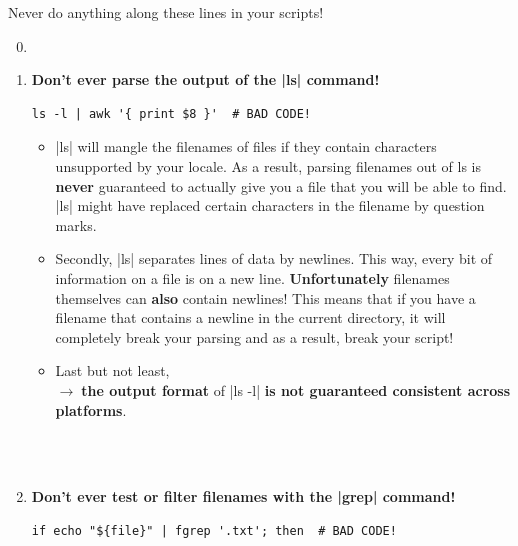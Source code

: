 \begin{frame}[fragile]{Never do anything along these lines in your scripts!}
    \begin{enumerate}
        \setcounter{enumi}{-1}
        \item<only@0> %
        \item<only@1>
            \alert{\large\textbf{Don't ever parse the output of the \bash|ls| command!}}
            \begin{lstlisting}[style=MyBash, numbers=none, aboveskip=3mm, belowskip=-6mm, xrightmargin=38mm]
                ls -l | awk '{ print $8 }'  # BAD CODE!
            \end{lstlisting}
            \begin{itemize}
                \item \bash|ls| will mangle the filenames of files if they contain characters unsupported by your locale.
                      As a result, \alert{parsing filenames out of ls is \textbf{never} guaranteed to actually give you a file that you will be able to find}.
                      \bash|ls| might have replaced certain characters in the filename by question marks.
                \item Secondly, \bash|ls| separates lines of data by newlines.
                      This way, every bit of information on a file is on a new line.
                      \alert{\textbf{Unfortunately} filenames themselves can \textbf{also} contain newlines!}
                      This means that if you have a filename that contains a newline in the current directory, it will completely break your parsing and as a result, break your script!
                \item Last but not least,\\ $\to\;$\alert{\textbf{the output format} of \bash|ls -l| \textbf{is not guaranteed consistent across platforms}}.
            \end{itemize}
            \\
            {$\;$\small{}}
        \item<only@2>
            \alert{\large\textbf{Don't ever test or filter filenames with the \bash|grep| command!}}
            \begin{lstlisting}[style=MyBash, numbers=none, aboveskip=3mm, belowskip=-6mm, xrightmargin=15mm]
                if echo "${file}" | fgrep '.txt'; then  # BAD CODE!


\end{lstlisting}
\end{enumerate}
\end{frame}
